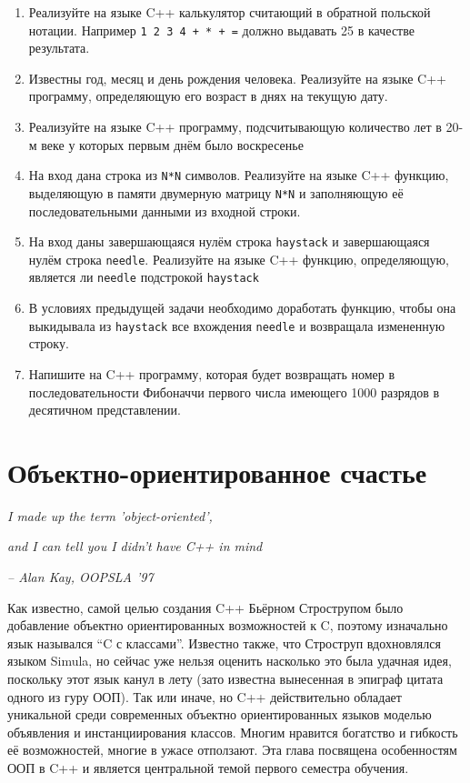 \documentclass[a4paper,12pt,oneside]{article}
\begin{document}
\begin{enumerate}
\item
Реализуйте на языке C++ калькулятор считающий в обратной польской нотации. Например \lstinline!1 2 3 4 + * + =! должно выдавать 25 в качестве результата.

\item
Известны год, месяц и день рождения человека. Реализуйте на языке C++ программу, определяющую его возраст в днях на текущую дату.

\item
Реализуйте на языке C++ программу, подсчитывающую количество лет в 20-м веке у которых первым днём было воскресенье

\item
На вход дана строка из \lstinline!N*N! символов. Реализуйте на языке C++ функцию, выделяющую в памяти двумерную матрицу \lstinline!N*N! и заполняющую её последовательными данными из входной строки.

\item
На вход даны завершающаяся нулём строка \lstinline!haystack! и завершающаяся нулём строка \lstinline!needle!. Реализуйте на языке C++ функцию, определяющую, является ли \lstinline!needle! подстрокой \lstinline!haystack!

\item
В условиях предыдущей задачи необходимо доработать функцию, чтобы она выкидывала из \lstinline!haystack! все вхождения \lstinline!needle! и возвращала измененную строку.

\item
Напишите на C++ программу, которая будет возвращать номер в последовательности Фибоначчи первого числа имеющего 1000 разрядов в десятичном представлении.

\end{enumerate}

\pagebreak
\section{Объектно-ориентированное счастье}

\hfill\textit{I made up the term 'object-oriented',}

\hfill\textit{and I can tell you I didn't have C++ in mind} {\vspace{0.5em}}

\hfill\textit{-- Alan Kay, OOPSLA '97}

Как известно, самой целью создания C++ Бьёрном Строструпом было добавление объектно ориентированных возможностей к C, поэтому изначально язык назывался ``C с классами''. Известно также, что Строструп вдохновлялся языком Simula, но сейчас уже нельзя оценить насколько это была удачная идея, поскольку этот язык канул в лету (зато известна вынесенная в эпиграф цитата одного из гуру ООП). Так или иначе, но C++ действительно обладает уникальной среди современных объектно ориентированных языков моделью объявления и инстанциирования классов. Многим нравится богатство и гибкость её возможностей, многие в ужасе отползают. Эта глава посвящена особенностям ООП в C++ и является центральной темой первого семестра обучения.
\end{document}
